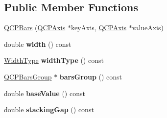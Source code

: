 \subsection*{Public Member Functions}
\begin{DoxyCompactItemize}
\item 
\hyperlink{class_q_c_p_bars_a64006999ad9dff308f40df41cef176ad}{Q\+C\+P\+Bars} (\hyperlink{class_q_c_p_axis}{Q\+C\+P\+Axis} $\ast$key\+Axis, \hyperlink{class_q_c_p_axis}{Q\+C\+P\+Axis} $\ast$value\+Axis)
\item 
double {\bfseries width} () const \hypertarget{class_q_c_p_bars_a42798c38abd5f5db22bd45d77f429625}{}\label{class_q_c_p_bars_a42798c38abd5f5db22bd45d77f429625}

\item 
\hyperlink{class_q_c_p_bars_a65dbbf1ab41cbe993d71521096ed4649}{Width\+Type} {\bfseries width\+Type} () const \hypertarget{class_q_c_p_bars_a8606651ada5804075f6affd04c88dd05}{}\label{class_q_c_p_bars_a8606651ada5804075f6affd04c88dd05}

\item 
\hyperlink{class_q_c_p_bars_group}{Q\+C\+P\+Bars\+Group} $\ast$ {\bfseries bars\+Group} () const \hypertarget{class_q_c_p_bars_a6d6b2b17619a0ba9c7a88bb2b90fc178}{}\label{class_q_c_p_bars_a6d6b2b17619a0ba9c7a88bb2b90fc178}

\item 
double {\bfseries base\+Value} () const \hypertarget{class_q_c_p_bars_a3c8686a74396883fd1da87b2e325b043}{}\label{class_q_c_p_bars_a3c8686a74396883fd1da87b2e325b043}

\item 
double {\bfseries stacking\+Gap} () const \hypertarget{class_q_c_p_bars_af2cdffc1a2adb784ec06a986691750cb}{}\label{class_q_c_p_bars_af2cdffc1a2adb784ec06a986691750cb}


\end{DoxyCompactItemize}
